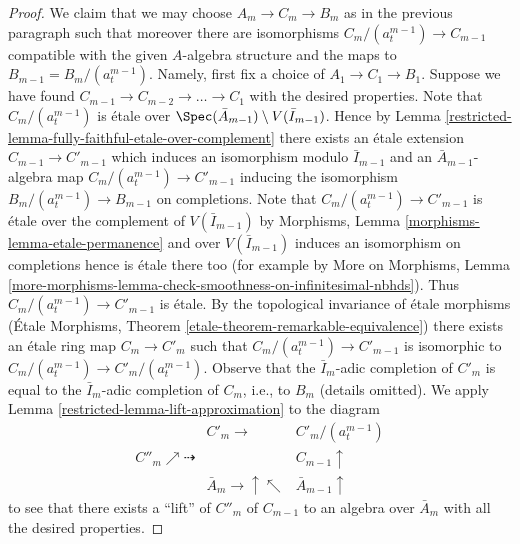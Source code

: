 \begin{proof}
\medskip\noindent
We claim that we may choose $A_m \to C_m \to B_m$ as in the previous
paragraph such that moreover there are isomorphisms
$C_m/(a_t^{m - 1}) \to C_{m - 1}$ compatible with the given
$A$-algebra structure and the maps to $B_{m - 1} = B_m/(a_t^{m - 1})$.
Namely, first fix a choice of $A_1 \to C_1 \to B_1$.
Suppose we have found $C_{m - 1} \to C_{m - 2} \to \ldots \to C_1$
with the desired properties.
Note that $C_m/(a_t^{m - 1})$ is \'etale over
$\Spec(\bar A_{m - 1}) \setminus V(\bar I_{m - 1})$.
Hence by Lemma \ref{restricted-lemma-fully-faithful-etale-over-complement}
there exists an \'etale extension $C_{m - 1} \to C'_{m - 1}$
which induces an isomorphism modulo $\bar I_{m - 1}$ and an
$\bar A_{m - 1}$-algebra map $C_m/(a_t^{m - 1}) \to C'_{m - 1}$
inducing the isomorphism $B_m/(a_t^{m - 1}) \to B_{m - 1}$ on completions.
Note that $C_m/(a_t^{m - 1}) \to C'_{m - 1}$ is \'etale over the complement
of $V(\bar I_{m - 1})$ by
Morphisms, Lemma \ref{morphisms-lemma-etale-permanence}
and over $V(\bar I_{m - 1})$ induces an isomorphism on completions
hence is \'etale there too (for example by More on Morphisms, Lemma
\ref{more-morphisms-lemma-check-smoothness-on-infinitesimal-nbhds}).
Thus $C_m/(a_t^{m - 1}) \to C'_{m - 1}$ is \'etale. By the
topological invariance of \'etale morphisms
(\'Etale Morphisms, Theorem \ref{etale-theorem-remarkable-equivalence})
there exists an \'etale ring map $C_m \to C'_m$ such that
$C_m/(a_t^{m - 1}) \to C'_{m - 1}$ is isomorphic to
$C_m/(a_t^{m - 1}) \to C'_m/(a_t^{m - 1})$. Observe that the
$\bar I_m$-adic completion of $C'_m$ is equal to the $\bar I_m$-adic
completion of $C_m$, i.e., to $B_m$ (details omitted).
We apply Lemma \ref{restricted-lemma-lift-approximation} to the diagram
$$
\begin{array}{ccc} & C'_m \longrightarrow & C'_m/(a_t^{m - 1}) \\ C''_m \nearrow\dashrightarrow &  & C_{m - 1} \uparrow \\  & \bar A_m \longrightarrow\uparrow\nwarrow & \bar A_{m - 1} \uparrow\end{array}
$$
to see that there exists a ``lift'' of $C''_m$ of $C_{m - 1}$
to an algebra over $\bar A_m$ with all the desired properties.


\end{proof}
